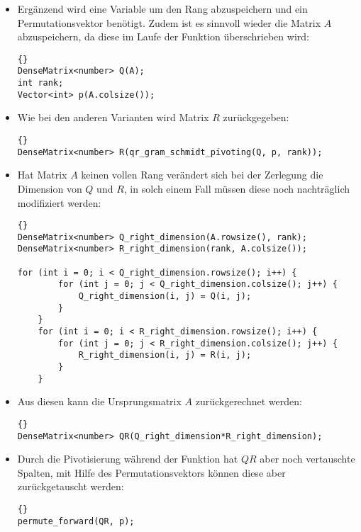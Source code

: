 \documentclass[a4paper,11pt]{article}
\theoremstyle{definition}
\begin{document}
\begin{itemize}
\item Ergänzend wird eine Variable um den Rang abzuspeichern und ein
Permutationsvektor benötigt. Zudem ist es sinnvoll wieder die Matrix $A$
abzuspeichern, da diese im Laufe der Funktion überschrieben wird:

    {\footnotesize{\begin{lstlisting}{}
DenseMatrix<number> Q(A);
int rank;
Vector<int> p(A.colsize());
\end{lstlisting}}}
    
\item Wie bei den anderen Varianten wird Matrix $R$ zurückgegeben:

    {\footnotesize{\begin{lstlisting}{}
DenseMatrix<number> R(qr_gram_schmidt_pivoting(Q, p, rank));
\end{lstlisting}}}

\item Hat Matrix $A$ keinen vollen Rang verändert sich bei der Zerlegung die
Dimension von $Q$ und $R$, in solch einem Fall müssen diese noch nachträglich
modifiziert werden:

    {\footnotesize{\begin{lstlisting}{}
DenseMatrix<number> Q_right_dimension(A.rowsize(), rank);
DenseMatrix<number> R_right_dimension(rank, A.colsize());

for (int i = 0; i < Q_right_dimension.rowsize(); i++) {
        for (int j = 0; j < Q_right_dimension.colsize(); j++) {
            Q_right_dimension(i, j) = Q(i, j);
        }
    }
    for (int i = 0; i < R_right_dimension.rowsize(); i++) {
        for (int j = 0; j < R_right_dimension.colsize(); j++) {
            R_right_dimension(i, j) = R(i, j);
        }
    }
\end{lstlisting}}}

\item Aus diesen kann die Ursprungsmatrix $A$ zurückgerechnet werden:

    {\footnotesize{\begin{lstlisting}{}
DenseMatrix<number> QR(Q_right_dimension*R_right_dimension);
\end{lstlisting}}}

\item Durch die Pivotisierung während der Funktion hat $QR$ aber noch vertauschte
Spalten, mit Hilfe des Permutationsvektors können diese aber zurückgetauscht werden:

    {\footnotesize{\begin{lstlisting}{}
permute_forward(QR, p);
\end{lstlisting}}}

\end{itemize}
\end{document}
